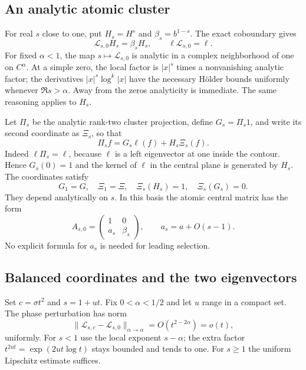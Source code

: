 \documentclass[11pt,a4paper]{article}
\numberwithin{equation}{section}
\theoremstyle{definition}
\theoremstyle{remark}
\newcommand{\Lop}{\mathcal L}
\newcommand{\Proj}{\Pi}
\begin{document}
\subsection{An analytic atomic cluster}
For real $s$ close to one, put
$H_s=H^s$ and $\beta_s=b^{1-s}$. The exact coboundary gives
\begin{equation}
 \Lop_{s,0}H_s=\beta_s H_s,\qquad
 \ell\Lop_{s,0}=\ell.
 \label{eq:atomic-detuned}
\end{equation}
For fixed $\alpha<1$, the map $s\mapsto\Lop_{s,0}$ is analytic in a
complex neighborhood of one on $C^\alpha$. At a simple zero, the local
factor is $|x|^s$ times a nonvanishing analytic factor; the derivatives
$|x|^s\log^k|x|$ have the necessary H\"older bounds uniformly whenever
$\Re s>\alpha$. Away from the zeros analyticity is immediate. The same
reasoning applies to $H_s$.

Let $\Proj_s$ be the analytic rank-two cluster projection, define
$G_s=\Proj_s1$, and write its second coordinate as $\Xi_s$, so that
\begin{equation}
 \Proj_sf=G_s\ell(f)+H_s\Xi_s(f).
 \label{eq:Ps}
\end{equation}
Indeed $\ell\Proj_s=\ell$, because $\ell$ is a left eigenvector at one
inside the contour. Hence $G_s(0)=1$ and the kernel of $\ell$ in the
central plane is generated by $H_s$. The coordinates satisfy
\begin{equation}
 G_1=G,\quad \Xi_1=\Xi,\quad \Xi_s(H_s)=1,\quad \Xi_s(G_s)=0.
 \label{eq:coords-detuned}
\end{equation}
They depend analytically on $s$. In this basis the atomic central matrix
has the form
\begin{equation}
 A_{s,0}=\begin{pmatrix}1&0\\a_s&\beta_s\end{pmatrix},
 \qquad a_s=a+O(s-1).
 \label{eq:detuned-matrix0}
\end{equation}
No explicit formula for $a_s$ is needed for leading selection.

\subsection{Balanced coordinates and the two eigenvectors}
Set $c=\sigma t^2$ and $s=1+ut$. Fix $0<\alpha<1/2$ and let $u$ range
in a compact set. The phase perturbation has norm
\begin{equation}
 \|\Lop_{s,c}-\Lop_{s,0}\|_{\alpha\to\alpha}
       =O(t^{2-2\alpha})=o(t),
 \label{eq:detuned-small}
\end{equation}
uniformly. For $s<1$ use the local exponent $s-\alpha$; the extra factor
$t^{2ut}=\exp(2ut\log t)$ stays bounded and tends to one. For $s\ge1$
the uniform Lipschitz estimate suffices.
\end{document}
